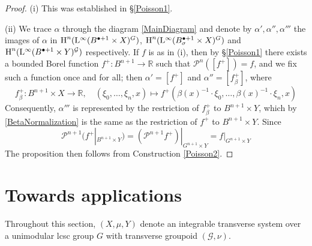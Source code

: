 \documentclass[11pt, oneside]{amsart}
\theoremstyle{definition}
\theoremstyle{remark}
\theoremstyle{TheoremNum}
\newcommand{\Hm}{\textup{H}}
\newcommand{\Linf}{\mathrm{L}^{\infty}}
\newcommand{\cG}{\mathcal{G}}
\newcommand{\bR}{\mathbb{R}}
\newcommand{\cP}{\mathcal P}
\begin{document}
\begin{proof} (i) This was established in \S\ref{Poisson1}.

\item (ii) We trace $\alpha$ through the diagram \eqref{MainDiagram} and denote by $\alpha', \alpha'', \alpha'''$ the images of $\alpha$ in $\Hm^n(\Linf(B^{\bullet+1} \times X)^{G})$, $\Hm^n(\Linf(B_\sigma^{\bullet+1} \times X)^{G})$ and $\Hm^n(\Linf(B^{\bullet+1} \times Y)^{\cG})$ respectively. If $f$ is as in (i), then by \S\ref{Poisson1} there exists a bounded Borel function $f^+: B^{n+1} \to \bR$ such that $\cP^n([f^+]) = f$, and we fix such a function once and for all; then $\alpha' = [f^+]$ and $\alpha'' = [f^+_\beta]$, where
\[
f^+_{\beta}: B^{n+1} \times X \to \bR, \quad (\xi_0, \dots, \xi_n, x) \mapsto   f^+(\beta(x)^{-1}\cdot \xi_0, \dots, \beta(x)^{-1}\cdot \xi_n, x)
\]
Consequently, $\alpha'''$ is represented by the restriction of $f^+_{\beta}$ to $B^{n+1} \times Y$, which by \eqref{BetaNormalization} is the same as the restriction of $f^+$ to $B^{n+1} \times Y$. Since 
\[\cP^{n+1}(f^+|_{B^{n+1} \times Y}) = (\cP^{n+1} f^+)|_{G^{n+1} \times Y} = f|_{G^{n+1} \times Y}\]
The proposition then follows from Construction \ref{Poisson2}.
\end{proof}

 \section{Towards applications}\label{sec:res:ind}

Throughout this section, $(X, \mu, Y)$ denote an integrable transverse system over a unimodular lcsc group $G$ with transverse groupoid $(\cG, \nu)$.
\end{document}
